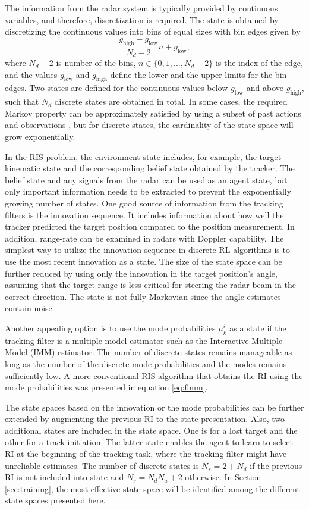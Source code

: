 \documentclass[english, 12pt, a4paper, elec, utf8, a-1b, online]{aaltothesis}
\numberwithin{equation}{section}
\newcommand{\glow}{g_\text{low}}
\newcommand{\ghigh}{g_\text{high}}
\newcommand{\modeprob}{\mu_k^i}
\begin{document}
The information from the radar system is typically provided by continuous variables, and therefore, discretization is required.
The state is obtained by discretizing the continuous values into bins of equal sizes with bin edges given by
\begin{equation}\label{eq:state_limits}
    \frac{\ghigh - \glow}{N_d - 2} n + \glow,
\end{equation}
where $N_d-2$ is number of the bins, $n \in \{0, 1, ..., N_d-2\}$ is the index of the edge, and
the values $\glow$ and $\ghigh$ define the lower and the upper limits for the bin edges.
Two states are defined for the continuous values below $\glow$ and above $\ghigh$, such that $N_d$ discrete states are obtained in total.
In some cases, the required Markov property can be approximately satisfied by using a subset of past actions and observations \cite{Mnih2013}, but for discrete states, the cardinality of the state space will grow exponentially.


In the RIS problem, 
the environment state includes, for example, the target kinematic state and the corresponding belief state obtained by the tracker. 
The belief state and any signals from the radar can be used as an agent state, but only important information needs to be extracted to prevent the exponentially growing number of states. 
One good source of information from the tracking filters is the innovation sequence. 
It includes information about how well the tracker predicted the target position compared to the position measurement. 
In addition, range-rate can be examined in radars with Doppler capability. 
The simplest way to utilize the innovation sequence in discrete RL algorithms is to use the most recent innovation as a state. 
The size of the state space can be further reduced by using only the innovation in the target position's angle, assuming that the target range is less critical for steering the radar beam in the correct direction.
The state is not fully Markovian since the angle estimates contain noise. 

Another appealing option is to use the mode probabilities $\modeprob$ as a state if the tracking filter is a multiple model estimator such as the Interactive Multiple Model (IMM) estimator. 
The number of discrete states remains manageable as long as the number of the discrete mode probabilities and the modes remains sufficiently low. 
A more conventional RIS algorithm that obtains the RI using the mode probabilities was presented in equation \eqref{eq:fimm}.

The state spaces based on the innovation or the mode probabilities can be further extended by augmenting the previous RI to the state presentation.
Also, two additional states are included in the state space. 
One is for a lost target and the other for a track initiation.
The latter state enables the agent to learn to select RI at the beginning of the tracking task, where the tracking filter might have unreliable estimates.
The number of discrete states is $N_s = 2+N_d$ if the previous RI is not included into state and $N_s = N_d N_a + 2$ otherwise.
In Section \ref{sec:training}, the most effective state space will be identified among the different state spaces presented here.
\end{document}
